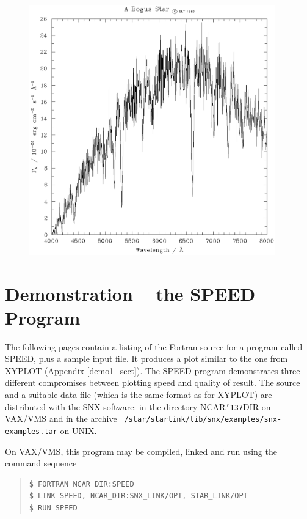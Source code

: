 \documentclass[11pt]{article}
\renewcommand{\_}{{\tt\char'137}}     %
\begin{document}
\begin{figure}
\includegraphics[width=0.95\textwidth]{sun90-fig-1.eps}
\end{figure}

\section {Demonstration -- the SPEED Program} \label{demo2_sect}

The following pages contain a listing of the Fortran source for a
program called SPEED, plus a sample input file.  It produces a plot
similar to the one from XYPLOT (Appendix \ref{demo1_sect}).  The SPEED
program demonstrates three different compromises between plotting speed
and quality of result.  The source and a suitable data file (which is
the same format as for XYPLOT) are distributed with the SNX software:
in the directory NCAR\_DIR on VAX/VMS and in the archive {\tt
/star/\-starlink/\-lib/\-snx/examples/snx-examples.tar} on UNIX.

On VAX/VMS, this program may be compiled, linked and run using the command
sequence

\begin {quote}
\begin{verbatim}
$ FORTRAN NCAR_DIR:SPEED
$ LINK SPEED, NCAR_DIR:SNX_LINK/OPT, STAR_LINK/OPT
$ RUN SPEED
\end{verbatim}
\end {quote}
\end{document}
